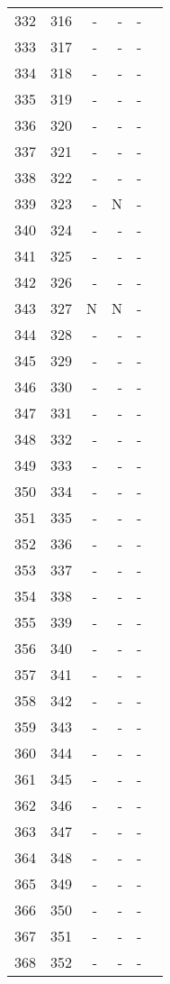 \begin{longtable}{rrrrrr}
  332 & 316 & - & - & - &  \\ 
  333 & 317 & - & - & - &  \\ 
  334 & 318 & - & - & - &  \\ 
  335 & 319 & - & - & - &  \\ 
  336 & 320 & - & - & - &  \\ 
  337 & 321 & - & - & - &  \\ 
  338 & 322 & - & - & - &  \\ 
  339 & 323 & - & N & - &  \\ 
  340 & 324 & - & - & - &  \\ 
  341 & 325 & - & - & - &  \\ 
  342 & 326 & - & - & - &  \\ 
  343 & 327 & N & N & - &  \\ 
  344 & 328 & - & - & - &  \\ 
  345 & 329 & - & - & - &  \\ 
  346 & 330 & - & - & - &  \\ 
  347 & 331 & - & - & - &  \\ 
  348 & 332 & - & - & - &  \\ 
  349 & 333 & - & - & - &  \\ 
  350 & 334 & - & - & - &  \\ 
  351 & 335 & - & - & - &  \\ 
  352 & 336 & - & - & - &  \\ 
  353 & 337 & - & - & - &  \\ 
  354 & 338 & - & - & - &  \\ 
  355 & 339 & - & - & - &  \\ 
  356 & 340 & - & - & - &  \\ 
  357 & 341 & - & - & - &  \\ 
  358 & 342 & - & - & - &  \\ 
  359 & 343 & - & - & - &  \\ 
  360 & 344 & - & - & - &  \\ 
  361 & 345 & - & - & - &  \\ 
  362 & 346 & - & - & - &  \\ 
  363 & 347 & - & - & - &  \\ 
  364 & 348 & - & - & - &  \\ 
  365 & 349 & - & - & - &  \\ 
  366 & 350 & - & - & - &  \\ 
  367 & 351 & - & - & - &  \\ 
  368 & 352 & - & - & - &  \\ 

\end{longtable}
